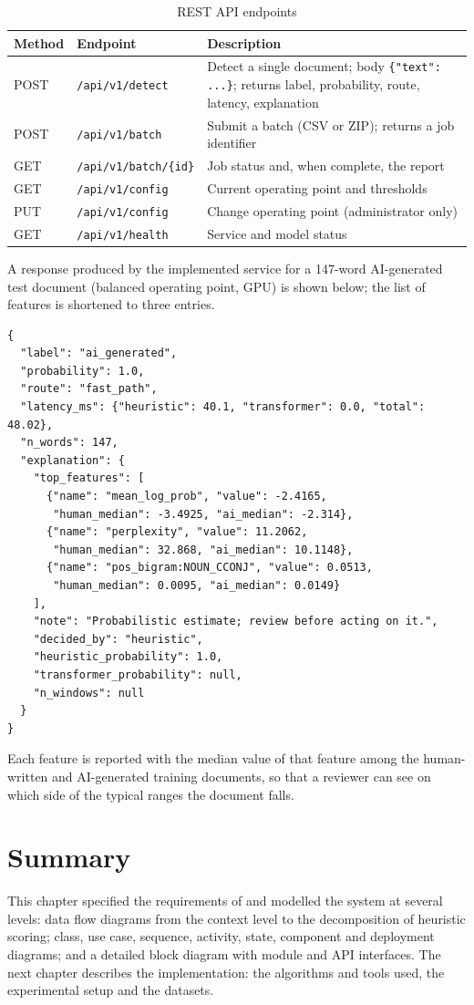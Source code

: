 \begin{table}[H]
\caption{REST API endpoints}
\label{tab:api}
\centering
\small
\begin{tabularx}{\textwidth}{|p{1.4cm}|p{3.6cm}|L|}
\hline
\textbf{Method} & \textbf{Endpoint} & \textbf{Description} \\ \hline
POST & \texttt{/api/v1/detect} & Detect a single document; body \texttt{\{"text": ...\}}; returns label, probability, route, latency, explanation \\ \hline
POST & \texttt{/api/v1/batch} & Submit a batch (CSV or ZIP); returns a job identifier \\ \hline
GET & \texttt{/api/v1/batch/\{id\}} & Job status and, when complete, the report \\ \hline
GET & \texttt{/api/v1/config} & Current operating point and thresholds \\ \hline
PUT & \texttt{/api/v1/config} & Change operating point (administrator only) \\ \hline
GET & \texttt{/api/v1/health} & Service and model status \\ \hline
\end{tabularx}
\end{table}

A response produced by the implemented service for a 147-word AI-generated
test document (balanced operating point, GPU) is shown below; the list of
features is shortened to three entries.
\begin{lstlisting}[language={},numbers=none,caption={JSON response of the detect endpoint for a fast-path decision},label={lst:json}]
{
  "label": "ai_generated",
  "probability": 1.0,
  "route": "fast_path",
  "latency_ms": {"heuristic": 40.1, "transformer": 0.0, "total": 48.02},
  "n_words": 147,
  "explanation": {
    "top_features": [
      {"name": "mean_log_prob", "value": -2.4165,
       "human_median": -3.4925, "ai_median": -2.314},
      {"name": "perplexity", "value": 11.2062,
       "human_median": 32.868, "ai_median": 10.1148},
      {"name": "pos_bigram:NOUN_CCONJ", "value": 0.0513,
       "human_median": 0.0095, "ai_median": 0.0149}
    ],
    "note": "Probabilistic estimate; review before acting on it.",
    "decided_by": "heuristic",
    "heuristic_probability": 1.0,
    "transformer_probability": null,
    "n_windows": null
  }
}
\end{lstlisting}
Each feature is reported with the median value of that feature among the
human-written and AI-generated training documents, so that a reviewer can see
on which side of the typical ranges the document falls.

\section{Summary}

This chapter specified the requirements of \veriscript{} and modelled the
system at several levels: data flow diagrams from the context level to the
decomposition of heuristic scoring; class, use case, sequence, activity, state,
component and deployment diagrams; and a detailed block diagram with module
and API interfaces. The next chapter describes the implementation: the
algorithms and tools used, the experimental setup and the datasets.
